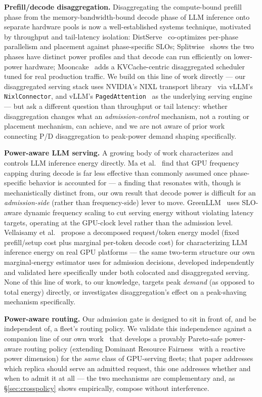 \documentclass[sigconf,review,anonymous]{acmart}
\begin{document}
\textbf{Prefill/decode disaggregation.} Disaggregating the compute-bound prefill phase from
the memory-bandwidth-bound decode phase of LLM inference onto separate hardware pools is now
a well-established systems technique, motivated by throughput and tail-latency isolation:
DistServe~\cite{zhong2024distserve} co-optimizes per-phase parallelism and placement against
phase-specific SLOs; Splitwise~\cite{patel2024splitwise} shows the two phases have distinct
power profiles and that decode can run efficiently on lower-power hardware;
Mooncake~\cite{qin2025mooncake} adds a KVCache-centric disaggregated scheduler tuned for real
production traffic. We build on this line of work directly --- our disaggregated serving
stack uses NVIDIA's NIXL transport library~\cite{nvidia2025nixl} via vLLM's
\texttt{NixlConnector}, and vLLM's \texttt{PagedAttention}~\cite{kwon2023pagedattention} as
the underlying serving engine --- but ask a different question than throughput or tail
latency: whether disaggregation changes what an \emph{admission-control} mechanism, not a
routing or placement mechanism, can achieve, and we are not aware of prior work connecting
P/D disaggregation to peak-power demand shaping specifically.

\textbf{Power-aware LLM serving.} A growing body of work characterizes and controls LLM
inference energy directly. Ma et al.~\cite{ma2026illusion} find that GPU frequency capping
during decode is far less effective than commonly assumed once phase-specific behavior is
accounted for --- a finding that resonates with, though is mechanistically distinct from, our
own result that decode power is difficult for an \emph{admission-side} (rather than
frequency-side) lever to move. GreenLLM~\cite{liu2025greenllm} uses SLO-aware dynamic
frequency scaling to cut serving energy without violating latency targets, operating at the
GPU-clock level rather than the admission level. Vellaisamy et
al.~\cite{vellaisamy2026characterization} propose a decomposed request/token energy model
(fixed prefill/setup cost plus marginal per-token decode cost) for characterizing LLM
inference energy on real GPU platforms --- the same two-term structure our own
marginal-energy estimator uses for admission decisions, developed independently and validated
here specifically under both colocated and disaggregated serving. None of this line of work,
to our knowledge, targets peak \emph{demand} (as opposed to total energy) directly, or
investigates disaggregation's effect on a peak-shaving mechanism specifically.

\textbf{Power-aware routing.} Our admission gate is designed to sit in front of, and be
independent of, a fleet's routing policy. We validate this independence against a companion
line of our own work~\cite{ghodsi2011drf, anonymous2026routing} that develops a provably
Pareto-safe power-aware routing policy (extending Dominant Resource
Fairness~\cite{ghodsi2011drf} with a reactive power dimension) for the \emph{same} class of
GPU-serving fleets; that paper addresses which replica should serve an admitted request, this
one addresses whether and when to admit it at all --- the two mechanisms are complementary
and, as \S\ref{sec:crosspolicy} shows empirically, compose without interference.
\end{document}
